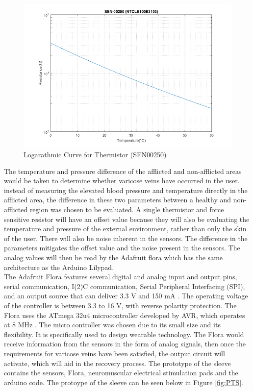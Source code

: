\documentclass[11.5pt]{article}
\begin{document}
\begin{figure}[!ht]
    \centering
    \includegraphics[width = 1.0\linewidth]{SEN00250.png}
    \caption{Logarathmic Curve for Thermistor (SEN00250)}
    \label{fig:Therm}
\end{figure}

The temperature and pressure difference of the afflicted and non-afflicted areas would be taken to determine whether varicose veins have occurred in the user. instead of measuring the elevated blood pressure and temperature directly in the afflicted area, the difference in these two parameters between a healthy and non-afflicted region was chosen to be evaluated. A single thermistor and force sensitive resistor will have an offset value because they will also be evaluating the temperature and pressure of the external environment, rather than only the skin of the user. There will also be noise inherent in the sensors. The difference in the parameters mitigates the offset value and the noise present in the sensors. The analog values will then be read by the Adafruit flora which has the same architecture as the Arduino Lilypad.\\

The Adafruit Flora features several digital and analog input and output pins, serial communication, I\superscript(2)C communication, Serial Peripheral Interfacing (SPI), and an output source that can deliver 3.3 V and 150 mA \cite{Ada}. The operating voltage of the controller is between 3.3 to 16 V, with reverse polarity protection. The Flora uses the ATmega 32u4 microcontroller developed by AVR, which operates at 8 MHz \cite{Ada}. The micro controller was chosen due to its small size and its flexibility. It is specifically used to design wearable technology. The Flora would receive information from the sensors in the form of analog signals, then once the requirements for varicose veins have been satisfied, the output circuit will activate, which will aid in the recovery process. The prototype of the sleeve contains the sensors, Flora, neuromuscular electrical stimulation pads and the arduino code. The protoype of the sleeve can be seen below in Figure \ref{fig:PTS}. 
\end{document}
